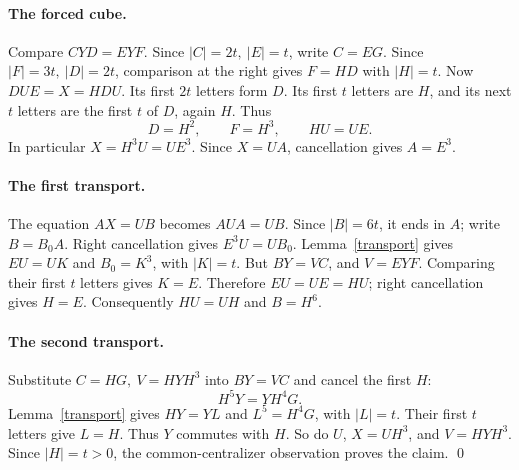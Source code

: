 \documentclass[10pt]{article}
\theoremstyle{remark}\newtheorem*{remark}{Remark}
\begin{document}
\paragraph{The forced cube.}
Compare \(CYD=EYF\). Since \(|C|=2t,\ |E|=t\), write \(C=EG\). Since \(|F|=3t,\ |D|=2t\), comparison at the right gives \(F=HD\) with \(|H|=t\). Now \(DUE=X=HDU\). Its first \(2t\) letters form \(D\). Its first \(t\) letters are \(H\), and its next \(t\) letters are the first \(t\) of \(D\), again \(H\). Thus
\[
 D=H^2,\qquad F=H^3,\qquad HU=UE.
\]
In particular \(X=H^3U=UE^3\). Since \(X=UA\), cancellation gives \(A=E^3\).

\paragraph{The first transport.}
The equation \(AX=UB\) becomes \(AUA=UB\). Since \(|B|=6t\), it ends in \(A\); write \(B=B_0 A\). Right cancellation gives \(E^3 U=U B_0\). Lemma~\ref{transport} gives \(EU=UK\) and \(B_0=K^3\), with \(|K|=t\). But \(BY=VC\), and \(V=EYF\). Comparing their first \(t\) letters gives \(K=E\). Therefore \(EU=UE=HU\); right cancellation gives \(H=E\). Consequently \(HU=UH\) and \(B=H^6\).

\paragraph{The second transport.}
Substitute \(C=HG,\ V=HYH^3\) into \(BY=VC\) and cancel the first \(H\):
\[
 H^5Y=YH^4G .
\]
Lemma~\ref{transport} gives \(HY=YL\) and \(L^5=H^4G\), with \(|L|=t\). Their first \(t\) letters give \(L=H\). Thus \(Y\) commutes with \(H\). So do \(U\), \(X=UH^3\), and \(V=HYH^3\). Since \(|H|=t>0\), the common-centralizer observation proves the claim. \qed
\end{document}
